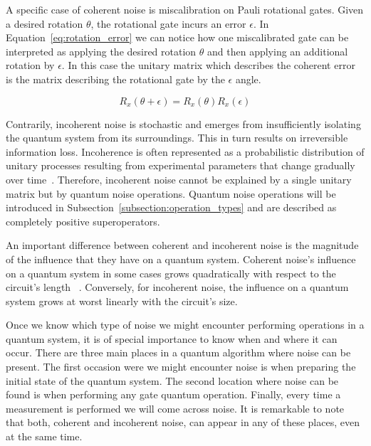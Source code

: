 A specific case of coherent noise is miscalibration on Pauli rotational
gates. Given a desired rotation \(\theta\), the rotational gate incurs
an error \(\epsilon\). In Equation~\ref{eq:rotation_error} we can notice
how one miscalibrated gate can be interpreted as applying the desired
rotation \(\theta\) and then applying an additional rotation by
\(\epsilon\). In this case the unitary matrix which describes the
coherent error is the matrix describing the rotational gate by the
\(\epsilon\) angle. \

\begin{equation}\label{eq:rotation_error}
  R_x\left(\theta + \epsilon\right) = R_x\left(\theta\right)R_x\left(\epsilon\right)
\end{equation}

Contrarily, incoherent noise is stochastic and emerges from insufficiently
isolating the quantum system from its surroundings. This in turn results
on irreversible information loss. Incoherence is often represented as a
probabilistic distribution of unitary processes resulting from experimental
parameters that change gradually over time~\cite{boulant_incoherent_2004}.
Therefore, incoherent noise cannot be explained by a single unitary matrix
but by quantum noise operations. Quantum noise operations will be introduced
in Subsection~\ref{subsection:operation_types} and are described as
completely positive superoperators. \

An important difference between coherent and incoherent noise is the
magnitude of the influence that they have on a quantum system.
Coherent noise's influence on a quantum system in some cases grows
quadratically with respect to the circuit's length
~\cite{iverson_coherence_2020}. Conversely, for incoherent noise,
the influence on a quantum system grows at worst linearly with the
circuit's size. \

Once we know which type of noise we might encounter performing operations
in a quantum system, it is of special importance to know when and where
it can occur. There are three main places in a quantum algorithm where
noise can be present. The first occasion were we might encounter noise is when
preparing the initial state of the quantum system. The second location
where noise can be found is when performing any gate quantum operation.
Finally, every time a measurement is performed we will come across noise.
It is remarkable to note that both, coherent and incoherent noise, can
appear in any of these places, even at the same time. \

